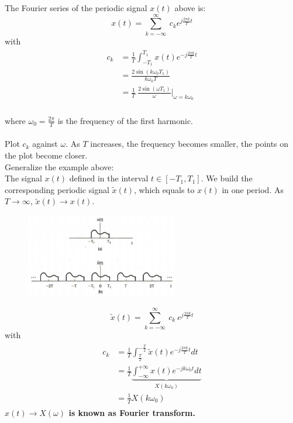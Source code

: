 \documentclass[12pt,a4paper]{article}
\begin{document}
\begin{tcolorbox}[breakable]
The Fourier series of the periodic signal $x(t)$ above is:
\[ x(t) =  \sum_{k=-\infty}^{\infty} \ c_{k} e^{j\frac{2\pi k}{T}t}\]
with
\begin{align*}\begin{split}
 c_{k} &= \frac{1}{T} \int_{-T_{1}}^{T_{1}} x(t)e^{-j\frac{2\pi k}{T}t} \\
 &= \frac{2 \sin(k \omega_{0} T_{1})}{k \omega_{0} T} \\
 &=\frac{1}{T} \ \frac{2 \sin(\omega T_{1})}{\omega} \bigg\rvert_{\omega = k \omega_{0}} 
 \end{split} \end{align*}\\
where $\omega_{0}=\frac{2\pi}{T}$ is the frequency of the first harmonic.\\\\
Plot $c_{k}$ against $\omega$. As $T$ increases, the frequency becomes smaller, the points on the plot become closer.\\

Generalize the example above:\\
The signal $x(t)$ defined in the interval $t \in [-T_{1}, T_{1}]$. We build the corresponding periodic signal $\tilde{x}(t)$, which equals to $x(t)$ in one period. As $T \to \infty$, $\tilde{x}(t) \to x(t)$.
\begin{figure}[H] \centering \includegraphics[width = 0.6\textwidth]{images/tildex} \end{figure}

 \[ \tilde{x}(t) = \sum_{k=-\infty}^{\infty} \ c_{k} \ e^{j\frac{2\pi k}{T}t} \]
 \quad with
 \begin{align*}\begin{split}
 c_{k} &= \frac{1}{T} \int_{\frac{T}{2}}^{-\frac{T}{2}} \tilde{x}(t)e^{-j\frac{2\pi k}{T}t} dt \\
 &= \frac{1}{T} \underbrace{\int_{-\infty}^{+\infty} x(t)e^{-j k \omega_{0} t} dt}_{X(k\omega_{0})}\\
&=\frac{1}{T} X(k\omega_{0}) 
 \end{split}\end{align*}
\textbf{ $x(t) \to X(\omega)$ is known as Fourier transform.}


\end{tcolorbox}
\end{document}
